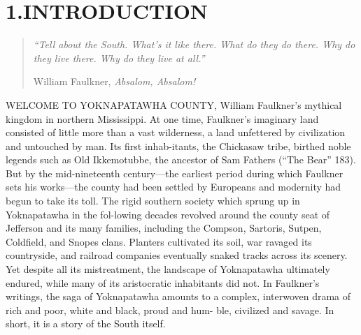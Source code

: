 \documentclass{article}
\begin{document}
\mdxtitleblockstart{}

\mdxauthorstart{}
\mdxauthorend\mdxtitleblockend%

\section{1.\hspace*{0.5em}INTRODUCTION}\label{sec-introduction}%

\noindent{}%


\begin{quote}%

\noindent{} \emph{“Tell about the South. What’s it like there. What do they do there. Why do they live there. Why do they live at all.”}%

William Faulkner, \emph{Absalom, Absalom!}%
\end{quote}%

\noindent{}%

 WELCOME TO YOKNAPATAWHA COUNTY, William Faulkner’s mythical kingdom in northern Mississippi. At one time, Faulkner’s imaginary land consisted of little more than a vast wilderness, a land unfettered by civilization and untouched by man. Its first inhab-itants, the Chickasaw tribe, birthed noble legends such as Old Ikkemotubbe, the ancestor of Sam Fathers (“The Bear” 183). But by the mid-nineteenth century––the earliest period during which Faulkner sets his works––the county had been settled by Europeans and modernity had  begun to take its toll. The rigid southern society which sprung up in Yoknapatawha in the fol-lowing decades revolved around the county seat of Jefferson and its many families, including the Compson, Sartoris, Sutpen, Coldfield, and Snopes clans. Planters cultivated its soil, war ravaged its countryside, and railroad companies eventually snaked tracks across its scenery. Yet despite all its mistreatment, the landscape of Yoknapatawha ultimately endured, while many of its aristocratic inhabitants did not. In Faulkner’s writings, the saga of Yoknapatawha amounts to a complex, interwoven drama of rich and poor, white and black, proud and hum- ble, civilized and savage. In short, it is a story of the South itself.%
\end{document}
